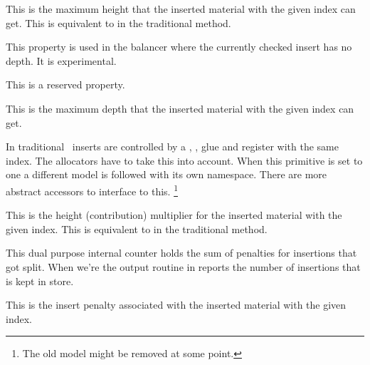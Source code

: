 This is the maximum height that the inserted material with the given index can
get. This is equivalent to  in the traditional method.

\stopnewprimitive

\startnewprimitive[title={\prm {insertlinedepth}}]

This property is used in the balancer where the currently checked insert has no
depth. It is experimental.

\stopnewprimitive

\startnewprimitive[title={\prm {insertlineheight}}]

This is a reserved property.

\stopnewprimitive

\startnewprimitive[title={\prm {insertmaxdepth}}]

This is the maximum depth that the inserted material with the given index can
get.

\stopnewprimitive

\startnewprimitive[title={\prm {insertmode}}]

In traditional \TEX\ inserts are controlled by a , , \prm
{glue} and  register with the same index. The allocators have to take
this into account. When this primitive is set to one a different model is
followed with its own namespace. There are more abstract accessors to interface
to this. \footnote {The old model might be removed at some point.}

\stopnewprimitive

\startnewprimitive[title={\prm {insertmultiplier}}]

This is the height (contribution) multiplier for the inserted material with the
given index. This is equivalent to  in the traditional method.

\stopnewprimitive

\startoldprimitive[title={\prm {insertpenalties}}]

This dual purpose internal counter holds the sum of penalties for insertions that
got split. When we're the output routine in reports the number of insertions that
is kept in store.

\stopoldprimitive

\startnewprimitive[title={\prm {insertpenalty}}]

This is the insert penalty associated with the inserted material with the given
index.

\stopnewprimitive

